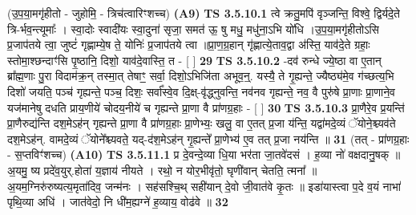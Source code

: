 \documentclass[17pt]{extarticle}
\begin{document}
                  \newline
                      (उ॒प॒या॒मगृ॑हीतो - जुहोमि॒ - त्रिच॑त्वारिꣳशच्च)  \textbf{(A9)} \newline \newline
                                        \textbf{ TS 3.5.10.1} \newline
                  त्वे क्रतु॒मपि॑ वृञ्जन्ति॒ विश्वे॒ द्विर्यदे॒ते त्रि-र्भव॒न्त्यूमाः᳚ । स्वा॒दोः स्वादी॑यः स्वा॒दुना॑ सृजा॒ समत॑ ऊ॒ षु मधु॒ मधु॑ना॒ऽभि यो॑धि ।उ॒प॒या॒मगृ॑हीतोऽसि प्र॒जाप॑तये त्वा॒ जुष्टं॑ गृह्णाम्ये॒ष ते॒ योनिः॑ प्र॒जाप॑तये त्वा ॥प्रा॒ण॒ग्र॒हान् गृ॑ह्णात्ये॒ताव॒द्वा अ॑स्ति॒ याव॑दे॒ते ग्रहाः॒ स्तोमा॒श्छन्दाꣳ॑सि पृ॒ष्ठानि॒ दिशो॒ याव॑दे॒वास्ति॒ त - [  ] \textbf{  29} \newline
                  \newline
                                \textbf{ TS 3.5.10.2} \newline
                  -दव॑ रुन्धे ज्ये॒ष्ठा वा ए॒तान् ब्रा᳚ह्म॒णाः पु॒रा विदाम॑क्र॒न् तस्मा॒त् तेषाꣳ॒॒ सर्वा॒ दिशो॒ऽभिजि॑ता अभूव॒न्॒. यस्यै॒ ते गृ॒ह्यन्ते॒ ज्यैष्ठ्य॑मे॒व ग॑च्छत्य॒भि दिशो॑ जयति॒ पञ्च॑ गृह्यन्ते॒ पञ्च॒ दिशः॒ सर्वा᳚स्वे॒व दि॒क्ष्-वृ॑द्ध्नुवन्ति॒ नव॑नव गृह्यन्ते॒ नव॒ वै पुरु॑षे प्रा॒णाः प्रा॒णाने॒व यज॑मानेषु दधति प्राय॒णीये॑ चोदय॒नीये॑ च गृह्यन्ते प्रा॒णा वै प्रा॑णग्र॒हाः - [  ] \textbf{  30} \newline
                  \newline
                                \textbf{ TS 3.5.10.3} \newline
                  प्रा॒णैरे॒व प्र॒यन्ति॑ प्रा॒णैरुद्य॑न्ति दश॒मेऽह॑न् गृह्यन्ते प्रा॒णा वै प्रा॑णग्र॒हाः प्रा॒णेभ्यः॒ खलु॒ वा ए॒तत् प्र॒जा य॑न्ति॒ यद्वा॑मदे॒व्यं ॅयोने॒श्च्यव॑ते दश॒मेऽह॑न्. वामदे॒व्यं ॅयोने᳚श्च्यवते॒ यद्-द॑श॒मेऽह॑न् गृ॒ह्यन्ते᳚ प्रा॒णेभ्य॑ ए॒व तत् प्र॒जा नय॑न्ति ॥ \textbf{  31} \newline
                  \newline
                      (तत् - प्रा॑णग्र॒हाः - स॒प्तविꣳ॑शच्च)  \textbf{(A10)} \newline \newline
                                        \textbf{ TS 3.5.11.1} \newline
                  प्र दे॒वन्दे॒व्या धि॒या भर॑ता जा॒तवे॑दसं । ह॒व्या नो॑ वक्षदानु॒षक् ॥ अ॒यमु॒ ष्य प्रदे॑व॒युर्.होता॑ य॒ज्ञाय॑ नीयते । रथो॒ न योर॒भीवृ॑तो॒ घृणी॑वान् चेतति॒ त्मना᳚ ॥ अ॒यम॒ग्निरु॑रुष्यत्य॒मृता॑दिव॒ जन्म॑नः । सह॑सश्चि॒थ् सही॑यान् दे॒वो जी॒वात॑वे कृ॒तः ॥ इडा॑यास्त्वा प॒दे व॒यं नाभा॑ पृथि॒व्या अधि॑ । जात॑वेदो॒ नि धी॑म॒ह्यग्ने॑ ह॒व्याय॒ वोढ॑वे ॥ \textbf{  32} \newline
\end{document}
